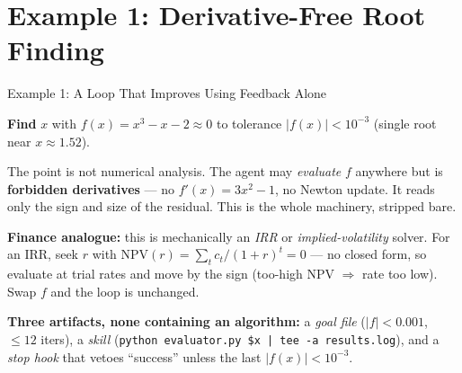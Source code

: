 \documentclass[9pt,t]{beamer}
\begin{document}
\section{Example 1: Derivative-Free Root Finding}

\begin{frame}{Example 1: A Loop That Improves Using Feedback Alone}

\textbf{Find} $x$ with $f(x)=x^3-x-2\approx 0$ to tolerance $|f(x)|<10^{-3}$
(single root near $x\approx 1.52$).

\medskip
\alert{The point is not numerical analysis.} The agent may \emph{evaluate} $f$
anywhere but is \textbf{forbidden derivatives} --- no $f'(x)=3x^2-1$, no Newton
update. It reads only the sign and size of the residual. This is the whole
machinery, stripped bare.

\medskip
\begin{bigpicture}
\textbf{Finance analogue:} this is mechanically an \emph{IRR} or
\emph{implied-volatility} solver. For an IRR, seek $r$ with
$\mathrm{NPV}(r)=\sum_t c_t/(1+r)^t=0$ --- no closed form, so evaluate at trial
rates and move by the sign (too-high NPV $\Rightarrow$ rate too low). Swap $f$ and
the loop is unchanged.
\end{bigpicture}

\medskip
\textbf{Three artifacts, none containing an algorithm:} a \emph{goal file}
($|f|<0.001$, $\leq 12$ iters), a \emph{skill} (\texttt{python evaluator.py \$x |
tee -a results.log}), and a \emph{stop hook} that vetoes ``success'' unless the
last $|f(x)|<10^{-3}$.
\end{frame}
\end{document}
